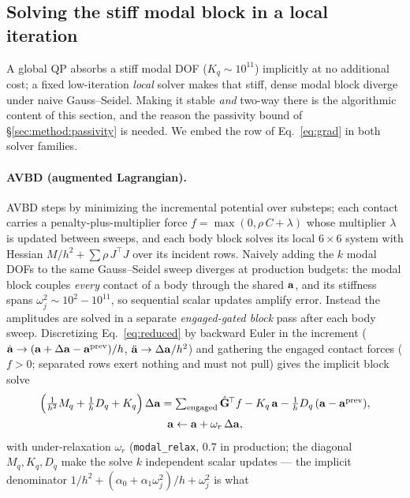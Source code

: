 \subsection{Solving the stiff modal block in a local iteration}
\label{sec:method:solve}
A global QP absorbs a stiff modal DOF ($K_q\!\sim\!10^{11}$) implicitly at no
additional cost; a
fixed low-iteration \emph{local} solver makes that stiff, dense modal block diverge
under naive Gauss--Seidel. Making it stable \emph{and} two-way there is the
algorithmic content of this section, and the reason the passivity bound of
\S\ref{sec:method:passivity} is needed. We embed the row of Eq.~\ref{eq:grad} in
both solver families.

\paragraph*{AVBD (augmented Lagrangian).} AVBD steps by minimizing the incremental
potential over substeps; each contact carries a penalty-plus-multiplier force
$f=\max(0,\rho\,C+\lambda)$ whose multiplier $\lambda$ is updated between sweeps,
and each body block solves its local $6\times6$ system with Hessian
$M/h^2+\sum\rho\,J^{\!\top}J$ over its incident rows. Naively adding the $k$ modal
DOFs to the same Gauss--Seidel sweep diverges at production budgets: the modal
block couples \emph{every} contact of a body through the shared $\mathbf{a}$, and its
stiffness spans $\omega_j^2\sim10^2\!-\!10^{11}$, so sequential scalar updates
amplify error. Instead the amplitudes are solved in a separate
\emph{engaged-gated block} pass after each body sweep. Discretizing
Eq.~\ref{eq:reduced} by backward Euler in the increment
($\dot{\mathbf{a}} \to (\mathbf{a}+\Delta\mathbf{a}-\mathbf{a}^{\mathrm{prev}})/h$,
$\ddot{\mathbf{a}} \to \Delta\mathbf{a}/h^2$) and gathering the engaged contact forces
($f>0$; separated rows exert nothing and must not pull) gives the implicit
block solve
\begin{equation}
\begin{gathered}
  \Big(\tfrac{1}{h^2}M_q+\tfrac{1}{h}D_q+K_q\Big)\,\Delta\mathbf{a}
  = \textstyle\sum_{\mathrm{engaged}}\hat{\mathbf{G}}^{\!\top} f
        - K_q\,\mathbf{a} - \tfrac{1}{h}D_q\,(\mathbf{a}-\mathbf{a}^{\mathrm{prev}}),\\
  \mathbf{a} \leftarrow \mathbf{a} + \omega_r\,\Delta\mathbf{a},
\end{gathered}
  \label{eq:qblock}
\end{equation}
with under-relaxation $\omega_r$ (\texttt{modal\_relax}, $0.7$ in production; the
diagonal $M_q,K_q,D_q$ make the solve $k$ independent scalar updates --- the
implicit denominator $1/h^2+(\alpha_0+\alpha_1\omega_j^2)/h+\omega_j^2$ is what
